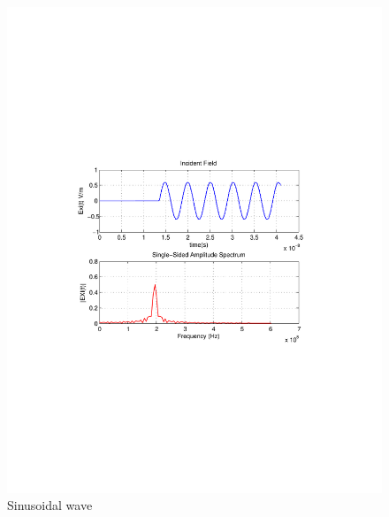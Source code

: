 \begin{figure}[H]
\centering
\includegraphics[scale=0.8, trim=3.5cm 8.7cm 4.5cm 8.85cm, clip]{Figures/FigCh03_IncidentFieldSinusoidal.pdf}
\caption{Sinusoidal wave}
\label{1DDNG-IncidentField-Sinusoidal}
\end{figure}
